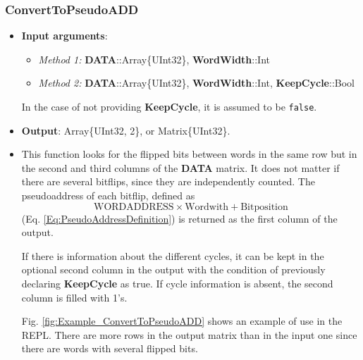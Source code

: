 \subsubsection*{ConvertToPseudoADD}\label{Func:ConvertToPseudoADD}
 \begin{itemize}
 	\item \textbf{Input arguments}: 
 	\begin{itemize}
 		\item \textit{Method 1: }\textbf{DATA}::Array\{UInt32\}, \textbf{WordWidth}::Int
 		\item \textit{Method 2: }\textbf{DATA}::Array\{UInt32\}, \textbf{WordWidth}::Int, \textbf{KeepCycle}::Bool
 	\end{itemize}
 
 	In the case of not providing \textbf{KeepCycle}, it is assumed to be \texttt{false}.
 
 	\item   \textbf{Output}: Array\{UInt32, 2\}, or Matrix\{UInt32\}.
 	\item  This function looks for the flipped bits between words in the same row but in the second
 	and third columns of the \textbf{DATA} matrix. It does not matter if there are several bitflips, since they are independently counted. 
 	The pseudoaddress  of each bitflip, defined as \[\text{WORDADDRESS}\times\text{Wordwith}+\text{Bitposition}\] (Eq. \ref{Eq:PseudoAddressDefinition}) is returned as the first column of the output.
 
 	If there is information about the different cycles, it can be kept in the optional second column in the output with the condition of previously declaring \textbf{KeepCycle} as true. If cycle information is absent, the second column is filled with 1's.
 	
 	Fig. \ref{fig:Example_ConvertToPseudoADD} shows an example of use in the REPL. There are more rows in the output matrix than in the input one since there are words with several flipped bits.
 	

\end{itemize}
